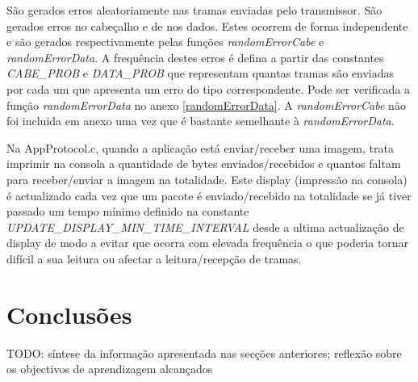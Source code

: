 \documentclass[11pt,a4paper,reqno]{report}
\numberwithin{equation}{section}
\begin{document}
\hfill \break
São gerados erros aleatoriamente nas tramas enviadas pelo transmissor. São gerados erros no cabeçalho e de nos dados. Estes ocorrem de forma independente e são gerados respectivamente pelas funções {\it randomErrorCabe} e {\it randomErrorData}. A frequência destes erros é defina a partir das constantes {\it CABE\_PROB} e {\it DATA\_PROB} que representam quantas tramas são enviadas por cada um que apresenta um erro do tipo correspondente. Pode ser verificada a função {\it randomErrorData} no anexo \ref{randomErrorData}. A {\it randomErrorCabe} não foi incluida em anexo uma vez que é bastante semelhante à {\it randomErrorData}.

\hfill \break
Na AppProtocol.c, quando a aplicação está enviar/receber uma imagem, trata imprimir na consola a quantidade de bytes enviados/recebidos e quantos faltam para receber/enviar a imagem na totalidade. Este display (impressão na consola) é actualizado cada vez que um pacote é enviado/recebido na totalidade se já tiver passado um tempo mínimo definido na constante {\it UPDATE\_DISPLAY\_MIN\_TIME\_INTERVAL} desde a ultima actualização de display de modo a evitar que ocorra com elevada frequência o que poderia tornar difícil a sua leitura ou afectar a leitura/recepção de tramas.


\chapter{Conclusões}

TODO: síntese da informação apresentada nas secções anteriores; reflexão sobre os objectivos de aprendizagem alcançados




\end{document}
